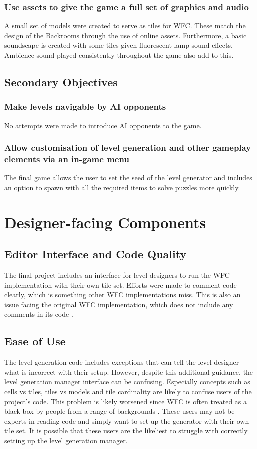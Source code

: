\subsubsection{Use assets to give the game a full set of graphics and audio}
A small set of models were created to serve as tiles for WFC. These match the design of the Backrooms through the use of online assets. Furthermore, a basic soundscape is created with some tiles given fluorescent lamp sound effects. Ambience sound played consistently throughout the game also add to this.%

\subsection{Secondary Objectives}
\subsubsection{Make levels navigable by AI opponents}
No attempts were made to introduce AI opponents to the game.

\subsubsection{Allow customisation of level generation and other gameplay elements via an in-game menu}
The final game allows the user to set the seed of the level generator and includes an option to spawn with all the required items to solve puzzles more quickly.

\section{Designer-facing Components}
\subsection{Editor Interface and Code Quality}
The final project includes an interface for level designers to run the WFC implementation with their own tile set. Efforts were made to comment code clearly, which is something other WFC implementations miss. This is also an issue facing the original WFC implementation, which does not include any comments in its code \cite{Gumin_Wave_Function_Collapse_2016}.

\subsection{Ease of Use}
The level generation code includes exceptions that can tell the level designer what is incorrect with their setup. However, despite this additional guidance, the level generation manager interface can be confusing. Especially concepts such as cells vs tiles, tiles vs models and tile cardinality are likely to confuse users of the project's code. This problem is likely worsened since WFC is often treated as a black box by people from a range of backgrounds \cite{WFC_In_The_Wild}. These users may not be experts in reading code and simply want to set up the generator with their own tile set. It is possible that these users are the likeliest to struggle with correctly setting up the level generation manager.

